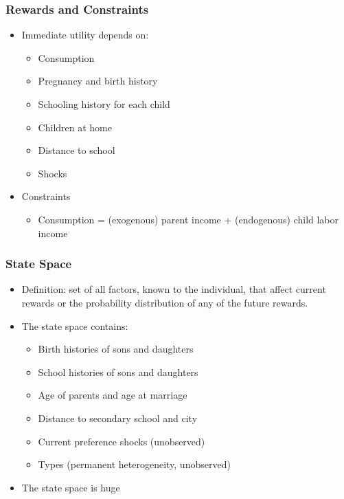 \documentclass[11pt]{beamer}
\begin{document}
\begin{frame}[c]\frametitle{Rewards and Constraints}
    \begin{itemize}
        \item Immediate utility depends on:
        \begin{itemize}
            \item Consumption
            \item Pregnancy and birth history
            \item Schooling history for each child
            \item Children at home
            \item Distance to school
            \item Shocks
        \end{itemize}
        \item Constraints
        \begin{itemize}
            \item Consumption = (exogenous) parent income + (endogenous) child labor income
        \end{itemize}
    \end{itemize}
\end{frame}


\begin{frame}[c]\frametitle{State Space}
    \begin{itemize}
        \item \alert{Definition}: set of all factors, known to the individual, that affect current rewards or the probability distribution of any of the future rewards.

        \item The state space contains:
        \begin{itemize}
            \item Birth histories of sons and daughters
            \item School histories of sons and daughters
            \item Age of parents and age at marriage
            \item Distance to secondary school and city
            \item Current preference shocks (unobserved)
            \item Types (permanent heterogeneity, unobserved)
        \end{itemize}
        \item The state space is huge
    \end{itemize}
\end{frame}
\end{document}

